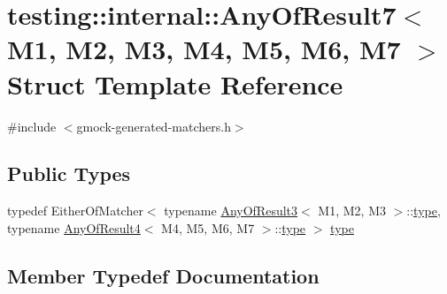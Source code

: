 \hypertarget{structtesting_1_1internal_1_1_any_of_result7}{}\section{testing\+::internal\+::Any\+Of\+Result7$<$ M1, M2, M3, M4, M5, M6, M7 $>$ Struct Template Reference}
\label{structtesting_1_1internal_1_1_any_of_result7}


{\ttfamily \#include $<$gmock-\/generated-\/matchers.\+h$>$}

\subsection*{Public Types}
\begin{DoxyCompactItemize}
\item 
typedef Either\+Of\+Matcher$<$ typename \mbox{\hyperlink{structtesting_1_1internal_1_1_any_of_result3}{Any\+Of\+Result3}}$<$ M1, M2, M3 $>$\+::\mbox{\hyperlink{structtesting_1_1internal_1_1_any_of_result7_a976873478921520833464a86f840abe8}{type}}, typename \mbox{\hyperlink{structtesting_1_1internal_1_1_any_of_result4}{Any\+Of\+Result4}}$<$ M4, M5, M6, M7 $>$\+::\mbox{\hyperlink{structtesting_1_1internal_1_1_any_of_result7_a976873478921520833464a86f840abe8}{type}} $>$ \mbox{\hyperlink{structtesting_1_1internal_1_1_any_of_result7_a976873478921520833464a86f840abe8}{type}}
\end{DoxyCompactItemize}


\subsection{Member Typedef Documentation}
\mbox{\label{structtesting_1_1internal_1_1_any_of_result7_a976873478921520833464a86f840abe8}} 
